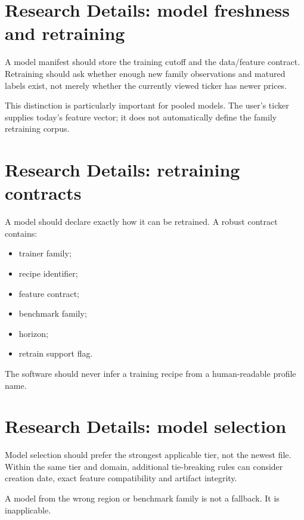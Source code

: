 \documentclass[11pt]{article}
\begin{document}
\section{Research Details: model freshness and retraining}
A model manifest should store the training cutoff and the data/feature contract. Retraining should ask whether enough new family observations and matured labels exist, not merely whether the currently viewed ticker has newer prices.

This distinction is particularly important for pooled models. The user's ticker supplies today's feature vector; it does not automatically define the family retraining corpus.

\section{Research Details: retraining contracts}
A model should declare exactly how it can be retrained. A robust contract contains:
\begin{itemize}[itemsep=0.15em]
\item trainer family;
\item recipe identifier;
\item feature contract;
\item benchmark family;
\item horizon;
\item retrain support flag.
\end{itemize}

The software should never infer a training recipe from a human-readable profile name.

\section{Research Details: model selection}
Model selection should prefer the strongest applicable tier, not the newest file. Within the same tier and domain, additional tie-breaking rules can consider creation date, exact feature compatibility and artifact integrity.

A model from the wrong region or benchmark family is not a fallback. It is inapplicable.
\end{document}
